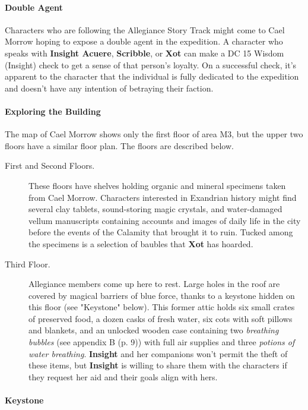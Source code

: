 \documentclass[letterpaper, 11pt, bg=full, twocolumn]{dndbook}
\begin{document}
\paragraph{Double Agent}

Characters who are following the Allegiance Story Track might come to Cael Morrow hoping to expose a double agent in the expedition. A character who speaks with \textbf{Insight Acuere}, \textbf{Scribble}, or \textbf{Xot} can make a DC 15 Wisdom (Insight) check to get a sense of that person's loyalty. On a successful check, it's apparent to the character that the individual is fully dedicated to the expedition and doesn't have any intention of betraying their faction.

\paragraph{Exploring the Building}

The map of Cael Morrow shows only the first floor of area M3, but the upper two floors have a similar floor plan. The floors are described below.

\begin{description}
\item[First and Second Floors.] These floors have shelves holding organic and mineral specimens taken from Cael Morrow. Characters interested in Exandrian history might find several clay tablets, sound-storing magic crystals, and water-damaged vellum manuscripts containing accounts and images of daily life in the city before the events of the Calamity that brought it to ruin. Tucked among the specimens is a selection of baubles that \textbf{Xot} has hoarded.
\item[Third Floor.] Allegiance members come up here to rest. Large holes in the roof are covered by magical barriers of blue force, thanks to a keystone hidden on this floor (see "Keystone" below). This former attic holds six small crates of preserved food, a dozen casks of fresh water, six cots with soft pillows and blankets, and an unlocked wooden case containing two \textit{breathing bubbles} (see appendix B (p. 9)) with full air supplies and three \textit{potions of water breathing}. \textbf{Insight} and her companions won't permit the theft of these items, but \textbf{Insight} is willing to share them with the characters if they request her aid and their goals align with hers.
\end{description}

\paragraph{Keystone}
\end{document}
